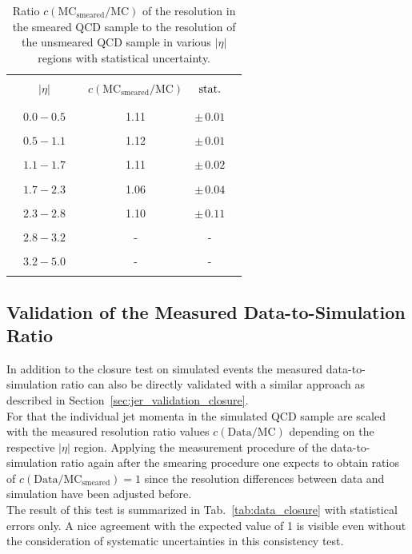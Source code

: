 \begin{table}[!tp]
\centering
\caption{Ratio $c\mathrm{(MC_{smeared}/MC)}$ of the resolution in the smeared QCD sample to the resolution of the unsmeared QCD sample in various $|\eta|$ regions with statistical uncertainty.}
\label{tab:mc_closure}
\begin{tabular}{cccccc}
\hline
 & & & & & \\
 & $|\eta|$ & & $c\mathrm{(MC_{smeared}/MC)}$ & $\rm{stat.}$ & \\
 & & & & & \\
\hline
 & & & & & \\
 & $0.0 - 0.5$ & & 1.11 & $\pm \, 0.01$ & \\
 & & & & & \\
 & $0.5 - 1.1$ & & 1.12 & $\pm \, 0.01$ & \\
 & & & & & \\
 & $1.1 - 1.7$ & & 1.11 & $\pm \, 0.02$ & \\
 & & & & & \\
 & $1.7 - 2.3$ & & 1.06 & $\pm \, 0.04$ & \\
 & & & & & \\
 & $2.3 - 2.8$ & & 1.10 & $\pm \, 0.11$ & \\
 & & & & & \\   
 & $2.8 - 3.2$ & & - & - & \\
 & & & & & \\  
 & $3.2 - 5.0$ & & - & - & \\
 & & & & & \\ 
 \hline 
\end{tabular}%
\end{table}  

\subsection{Validation of the Measured Data-to-Simulation Ratio}
\label{sec:jer_validation_ratio}
In addition to the closure test on simulated events the measured data-to-simulation ratio can also be directly validated with a similar approach as described in Section~\ref{sec:jer_validation_closure}.\\
For that the individual jet momenta in the simulated QCD sample are scaled with the measured resolution ratio values $c{(\mathrm{Data}/\mathrm{MC})}$ depending on the respective $|\eta|$ region. Applying the measurement procedure of the data-to-simulation ratio again after the smearing procedure one expects to obtain ratios of $c\mathrm{(Data/MC_{smeared})} = 1$ since the resolution differences between data and simulation have been adjusted before. \\
The result of this test is summarized in Tab.~\ref{tab:data_closure} with statistical errors only. A nice agreement with the expected value of 1 is visible even without the consideration of systematic uncertainties in this consistency test. 

